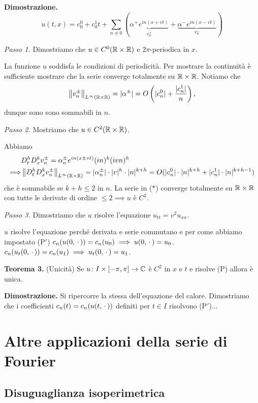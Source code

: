 \textbf{Dimostrazione.}
$$
	u(t,x) = c_0^0 + c_0^1 t + \sum_{n \neq  0} 
	(
	\underbrace{\alpha^+ e^{in(x + vt)}}_{v^+_n} 
	+ 
	\underbrace{\alpha^- e^{in(x - vt)}}_{v^-_n}
	)
$$

\textit{Passo 1.}
Dimostriamo che $u \in C^0(\mathbb R \times \mathbb R)$ e $2\pi$-periodica in $x$. 

La funzione $u$ soddisfa le condizioni di periodicità. Per mostrare la continuità è sufficiente mostrare che la serie converge totalmente su $\mathbb R \times \mathbb R$. Notiamo che
$$
	\left\lVert v^\pm_n \right\rVert_{L^\infty(\mathbb R \times \mathbb R)} = |\alpha^\pm| = O\left( |c_n^0| + \frac{|c_n^1|}{n} \right),
$$
dunque sono sono sommabili in $n$.

\textit{Passo 2.}
Mostriamo che $u \in C^2(\mathbb R \times \mathbb R)$. 

Abbiamo 
%
\begin{align*}
	& D_t^h D_x^k v_n^\pm = \alpha^\pm_n e^{in(x \pm vt)} (in)^k (ivn)^h \\
	\Longrightarrow & \left\lVert D_t^h D_x^k v^\pm_n \right\rVert_{L^\infty(\mathbb R \times \mathbb R)} = |\alpha^\pm_n| \cdot |v|^h \cdot |n|^{k+h}
	= O(|c_n^0| \cdot |n|^{k+h} + |c_n^1| \cdot |n|^{k + h - 1}) 
\end{align*}
%
che è sommabile se $k + h \leq 2$ in $n$. La serie in ($*$) converge totalmente su $\mathbb R \times \mathbb R$ con tutte le derivate di ordine $\leq 2 \implies u$ è $C^2$.

\textit{Passo 3.}
Dimostriamo che $u$ risolve l'equazione $u_{tt} = v^2 u_{xx}$.

$u$ risolve l'equazione perché derivata e serie commutano e per come abbiamo impostato (P$'$) $c_n(u(0, \,\cdot\,)) = c_n(u_0) \implies u(0, \,\cdot\,) = u_0$. $c_n(u_t(0, \,\cdot\,)) = c_n(u_1) \implies u_t(0, \,\cdot\,) = u_1$.

\textbf{Teorema 3.} (Unicità)
Se $u \colon I \times [-\pi, \pi] \to \mathbb C$ è $C^2$ in $x$ e $t$ e risolve (P) allora è unica.

\textbf{Dimostrazione.}
Si ripercorre la stessa dell'equazione del calore. Dimostriamo che i coefficienti $c_n(t) = c_n(u(t, \,\cdot\,))$ definiti per $t \in I$ risolvono (P$'$)...

\section{Altre applicazioni della serie di Fourier}

\subsection{Disuguaglianza isoperimetrica}

